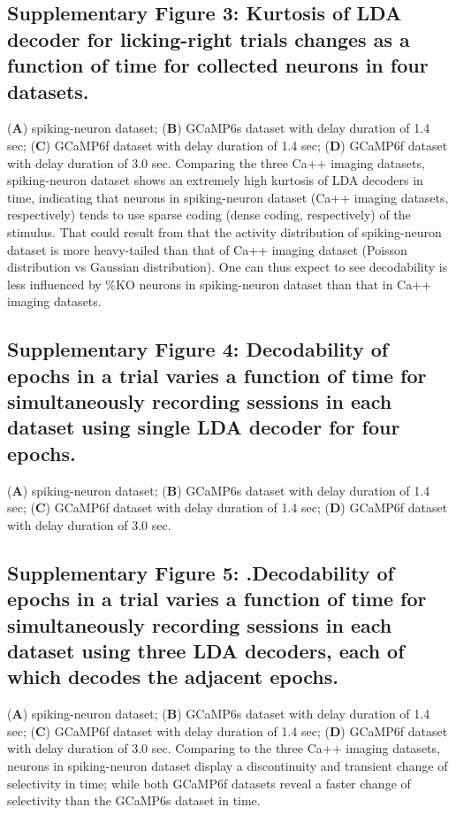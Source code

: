 \documentclass[12pt, oneside]{nature}
\begin{document}
\subsection{Supplementary Figure 3: Kurtosis of LDA decoder
for licking-right trials changes as a function of time
for collected neurons in four datasets.} 
(\textbf{A}) spiking-neuron dataset; 
(\textbf{B}) GCaMP6s dataset with delay duration of 1.4 sec;
(\textbf{C}) GCaMP6f dataset with delay duration of 1.4 sec;
(\textbf{D}) GCaMP6f dataset with delay duration of 3.0 sec.
Comparing the three Ca++ imaging datasets,
spiking-neuron dataset shows an extremely high kurtosis
of LDA decoders in time, indicating that neurons in
spiking-neuron dataset (Ca++ imaging datasets, respectively)
tends to use sparse coding (dense coding, respectively)
of the stimulus. That could result from that the
activity distribution of spiking-neuron dataset
is more heavy-tailed than that of Ca++ imaging 
dataset (Poisson distribution vs Gaussian distribution). One can thus expect to see decodability
is less influenced by \%KO neurons in spiking-neuron dataset
than that in Ca++ imaging datasets.

\subsection{Supplementary Figure 4: Decodability of epochs in a trial varies a function 
of time for simultaneously recording sessions in each dataset using single LDA decoder
for four epochs.} 
(\textbf{A}) spiking-neuron dataset; 
(\textbf{B}) GCaMP6s dataset with delay duration of 1.4 sec;
(\textbf{C}) GCaMP6f dataset with delay duration of 1.4 sec;
(\textbf{D}) GCaMP6f dataset with delay duration of 3.0 sec.

\subsection{Supplementary Figure 5: .Decodability of epochs in a trial varies a function 
of time for simultaneously recording sessions in each dataset using three LDA decoders,
each of which decodes the adjacent epochs.} 
(\textbf{A}) spiking-neuron dataset; 
(\textbf{B}) GCaMP6s dataset with delay duration of 1.4 sec;
(\textbf{C}) GCaMP6f dataset with delay duration of 1.4 sec;
(\textbf{D}) GCaMP6f dataset with delay duration of 3.0 sec.
Comparing to the three Ca++ imaging datasets, neurons in spiking-neuron
dataset display a discontinuity and transient change of selectivity in time; while
both GCaMP6f datasets reveal a faster change of selectivity than 
the GCaMP6s dataset in time.
\end{document}
